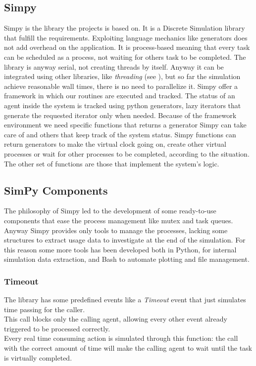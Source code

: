 \subsection{Simpy}\label{simpy}
Simpy is the library the projects is based on. It is a Discrete Simulation
library that fulfill the requirements. Exploiting language mechanics like
generators does not add overhead on the application. It is process-based
meaning that every task can be scheduled as a process, not waiting for others
task to be completed. The library is anyway serial, not creating threads by
itself. Anyway it can be integrated using other libraries, like \textit{threading} (see
\cite{threading}), but so far the simulation achieve reasonable wall times,
there is no need to parallelize it.
Simpy offer a framework in which our routines are executed and tracked. The
status of an agent inside the system is tracked using python generators,
lazy iterators that generate the requested iterator only when needed. Because of
the framework environment we need specific functions that returns a generator
Simpy can take care of and others that keep track of the system status. Simpy
functions can return generators to make the virtual clock going on, create other
virtual processes or wait for other processes to be completed, according to the
situation. The other set of functions are those that implement the system's logic.

\subsection{SimPy Components}
The philosophy of Simpy led to the development of some ready-to-use components
that ease the process management like mutex and task queues.
Anyway Simpy provides only tools to manage the processes, lacking some
structures to extract usage data to investigate at the end of the simulation.
For this reason some more tools has been developed both in Python, for internal
simulation data extraction, and Bash to automate plotting and file management.

\subsubsection*{Timeout}
The library has some predefined events like a \textit{Timeout} event that just
simulates time passing for the caller.\\
This call blocks only the calling agent, allowing every other event already
triggered to be processed correctly. \\
Every real time consuming action is simulated through this function: the call
with the correct amount of time will make the calling agent to wait until the
task is virtually completed.

